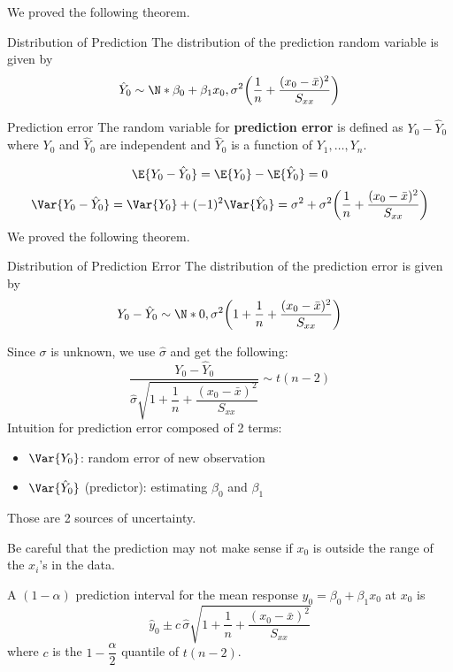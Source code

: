 We proved the following theorem.
\begin{Theorem}{Distribution of Prediction}{}
  The distribution of the prediction random variable is given by
  \[ \hat{Y}_0 \sim \N*{\beta_0+\beta_1x_0,
      \sigma^2\biggl( \frac{1}{n} +\frac{(x_0-\bar{x})^2}{S_{xx}}  \biggr)} \]
\end{Theorem}
\begin{Definition}{Prediction error}{}
  The random variable for \textbf{prediction error} is defined as
  $ Y_0-\hat{Y}_0 $
  where $ Y_0 $ and $ \hat{Y}_0 $ are independent
  and $ \hat{Y}_0 $ is a function of $ Y_1,\ldots,Y_n $.
\end{Definition}
\[ \E{Y_0-\hat{Y}_0}=\E{Y_0}-\E{\hat{Y}_0}=0 \]
\[ \Var{Y_0-\hat{Y}_0}=\Var{Y_0}+(-1)^2\Var{\hat{Y}_0}
  =\sigma^2+\sigma^2\biggl(\frac{1}{n} +\frac{(x_0-\bar{x})^2}{S_{xx}} \biggr)
\]
We proved the following theorem.
\begin{Theorem}{Distribution of Prediction Error}{}
  The distribution of the prediction error is given by
  \[ Y_0-\hat{Y}_0
    \sim \N*{0,\sigma^2\biggl( 1+\frac{1}{n}+\frac{(x_0-\bar{x})^2}{S_{xx}}  \biggr)} \]
\end{Theorem}
Since $ \sigma $ is unknown, we use $ \hat{\sigma} $ and get the following:
\[ \frac{Y_0-\hat{Y}_0}{
    \hat{\sigma}\sqrt{1+\dfrac{1}{n}+\dfrac{(x_0-\bar{x})^2}{S_{xx}}}
  } \sim t(n-2) \]
Intuition for prediction error composed of 2 terms:
\begin{itemize}
  \item $ \Var{Y_0} $: random error of new observation
  \item $ \Var{\hat{Y}_0} $ (predictor): estimating $ \beta_0 $ and $ \beta_1 $
\end{itemize}
Those are 2 sources of uncertainty.

\begin{Remark}{}{}
  Be careful that the prediction may not make sense if
  $ x_0 $ is outside the range of the $ x_i $'s in the data.
\end{Remark}

A $ (1-\alpha) $ prediction interval for the mean response $ y_0=\beta_0+\beta_1x_0 $
at $ x_0 $
is
\[ \hat{y}_0\pm c\, \hat{\sigma}\sqrt{1+\dfrac{1}{n}+\dfrac{(x_0-\bar{x})^2}{S_{xx}}}
\]
where $ c $ is the $ 1-\dfrac{\alpha}{2} $ quantile of $ t(n-2) $.
